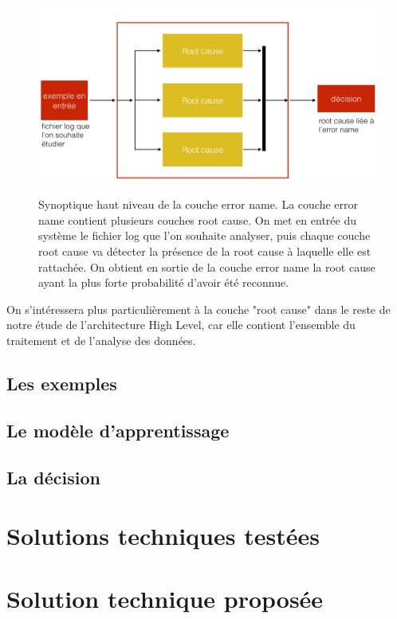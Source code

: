 \begin{figure}[h]
	\centering\includegraphics[height=6.5cm]{images/synoptique_error.png}
	\caption[Synoptique haut niveau de la couche error name]{Synoptique haut niveau de la couche error name. La couche error name contient plusieurs couches root cause. On met en entrée du système le fichier log que l'on souhaite analyser, puis chaque couche root cause va détecter la présence de la root cause à laquelle elle est rattachée. On obtient en sortie de la couche error name la root cause  ayant la plus forte probabilité d'avoir été reconnue.}
	\label{fig:synoptique haut niveau de la solution proposée: couche error name}
\end{figure}

On s'intéressera plus particulièrement à la couche "root cause" dans le reste de notre étude de l'architecture High Level, car elle contient l'ensemble du traitement et de l'analyse des données.

\subsection{Les exemples}
\label{Automatisation du processus d'investigation: Achitecture High Level du système proposé: Les exemples}

\subsection{Le modèle d'apprentissage}
\label{Automatisation du processus d'investigation: Achitecture High Level du système proposé: Le modèle d'apprentissage}

\subsection{La décision}
\label{Automatisation du processus d'investigation: Achitecture High Level du système proposé: La décision}



\section{Solutions techniques testées}
\label{Automatisation du processus d'investigation: Solutions techniques testées}




\section{Solution technique proposée}
\label{Automatisation du processus d'investigation: Solution technique proposée}

